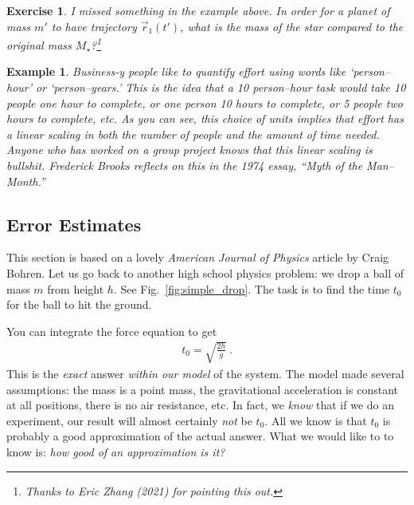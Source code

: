 \documentclass[
  11pt,
	colorful,
	raggedright,
]{tufte-style-thesis-flip}
\newtheorem{exercise}{Exercise}[section]
\newtheorem{example}{Example}[section]
\begin{document}
\begin{exercise} 
I missed something in the example above. In order for a planet of mass $m'$ to have trajectory $\vec r_1(t')$, what is the mass of the star compared to the original mass $M_\star$?\footnote{Thanks to Eric Zhang (2021) for pointing this out.} 
\end{exercise}

\begin{example} 
Business-y people like to quantify effort using words like `person--hour' or `person--years.' This is the idea that a 10 person--hour task would take 10 people one hour to complete, or one person 10 hours to complete, or 5 people two hours to complete, etc.  As you can see, this choice of units implies that effort has a linear scaling in both the number of people and the amount of time needed. Anyone who has worked on a group project knows that this linear scaling is bullshit. Frederick Brooks reflects on this in the 1974 essay, ``Myth of the Man--Month.''
\end{example}

\subsection{Error Estimates}

This section is based on a lovely \emph{American Journal of Physics} article by Craig Bohren.%
Let us go back to another high school physics problem: we drop a ball of mass $m$ from height $h$. See Fig.~\ref{fig:simple_drop}. The task is to find the time $t_0$ for the ball to hit the ground.
%

You can integrate the force equation to get
\begin{align}
  t_0 = \sqrt{\frac{2h}{g}} \ .
\end{align}
This is the \emph{exact} answer \emph{within our model} of the system. The model made several assumptions: the mass is a point mass, the gravitational acceleration is constant at all positions, there is no air resistance, etc. In fact, we \emph{know} that if we do an experiment, our result will almost certainly \emph{not} be $t_0$. All we know is that $t_0$ is probably a good approximation of the actual answer. What we would like to to know is: \emph{how good of an approximation is it?}
\end{document}
